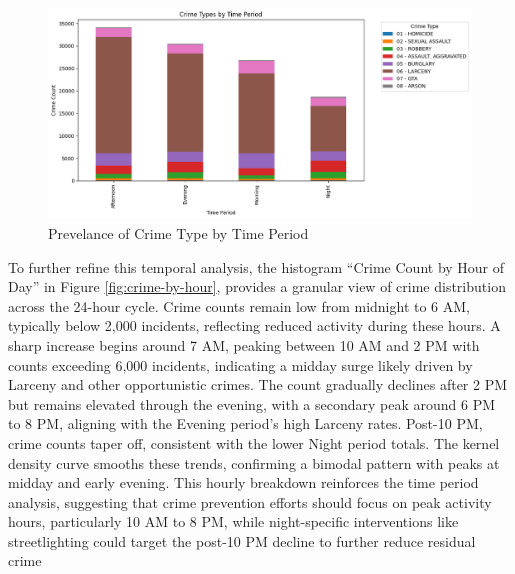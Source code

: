 \documentclass{report}
\begin{document}
\newpage
\begin{figure}[h]
  \begin{center}
    \advance\leftskip-3cm
    \advance\rightskip-3cm
    \includegraphics[keepaspectratio=true,scale=.6]{crime-types-by-time}
    \caption{Prevelance of Crime Type by Time Period}
    \label{fig:crime-type-by-time}
  \end{center}
\end{figure}


\par To further refine this temporal analysis, the histogram “Crime Count by Hour of Day” in Figure \ref{fig:crime-by-hour}, provides a granular view of crime distribution across the 24-hour cycle. Crime counts remain low from midnight to 6 AM, typically below 2,000 incidents, reflecting reduced activity during these hours. A sharp increase begins around 7 AM, peaking between 10 AM and 2 PM with counts exceeding 6,000 incidents, indicating a midday surge likely driven by Larceny and other opportunistic crimes. The count gradually declines after 2 PM but remains elevated through the evening, with a secondary peak around 6 PM to 8 PM, aligning with the Evening period’s high Larceny rates. Post-10 PM, crime counts taper off, consistent with the lower Night period totals. The kernel density curve smooths these trends, confirming a bimodal pattern with peaks at midday and early evening. This hourly breakdown reinforces the time period analysis, suggesting that crime prevention efforts should focus on peak activity hours, particularly 10 AM to 8 PM, while night-specific interventions like streetlighting could target the post-10 PM decline to further reduce residual crime
\end{document}
